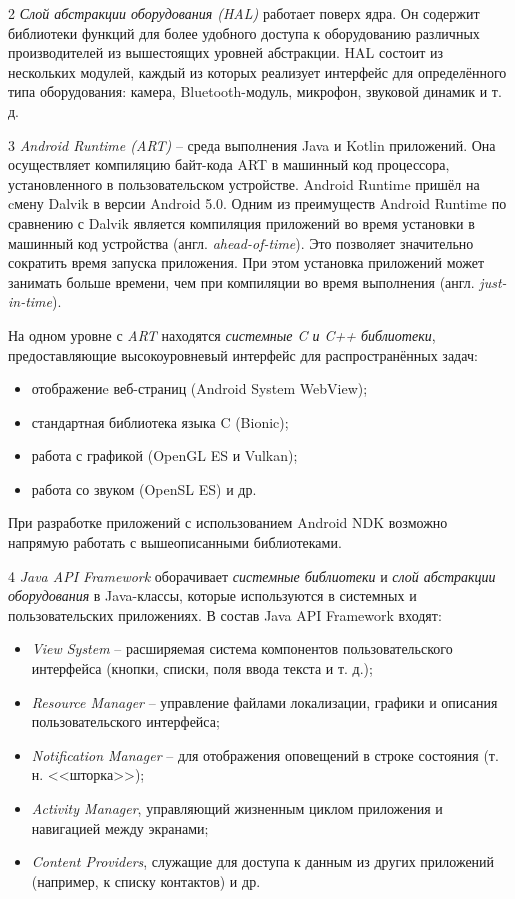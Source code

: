 2 \textit{Слой абстракции оборудования (HAL)} работает поверх ядра.
Он содержит библиотеки функций для более удобного доступа к оборудованию различных производителей из вышестоящих уровней абстракции.
HAL состоит из нескольких модулей, каждый из которых реализует интерфейс для определённого типа оборудования: камера, Bluetooth-модуль, микрофон, звуковой динамик и т. д. 

3 \textit{Android Runtime (ART)} -- среда выполнения Java и Kotlin приложений.
Она осуществляет компиляцию байт-кода ART в машинный код процессора, установленного в пользовательском устройстве.
Android Runtime пришёл на cмену Dalvik в версии Android 5.0.
Одним из преимуществ Android Runtime по сравнению с Dalvik является компиляция приложений во время установки в машинный код устройства (англ. \textit{ahead-of-time}).
Это позволяет значительно сократить время запуска приложения.
При этом установка приложений может занимать больше времени, чем при компиляции во время выполнения (англ. \textit{just-in-time}).

На одном уровне с \textit{ART} находятся \textit{системные C и C++ библиотеки}, предоставляющие высокоуровневый интерфейс для распространённых задач:
\begin{itemize}
	\item отображениe веб-страниц (Android System WebView);
	\item стандартная библиотека языка C (Bionic);
	\item работа с графикой (OpenGL ES и Vulkan);
	\item работа со звуком (OpenSL ES) и др.
\end{itemize}

При разработке приложений с использованием Android NDK возможно напрямую работать с вышеописанными библиотеками.

4 \textit{Java API Framework} оборачивает \textit{системные библиотеки} и \textit{слой абстракции оборудования} в Java-классы, которые используются в системных и пользовательских приложениях. В состав Java API Framework входят:
\begin{itemize}
	\item \textit{View System} -- расширяемая система компонентов пользовательского интерфейса (кнопки, списки, поля ввода текста и т. д.);
	\item \textit{Resource Manager} -- управление файлами локализации, графики и описания пользовательского интерфейса;
	\item \textit{Notification Manager} -- для отображения оповещений в строке состояния (т. н. <<шторка>>);
	\item \textit{Activity Manager}, управляющий жизненным циклом приложения и навигацией между экранами;
	\item \textit{Content Providers}, служащие для доступа к данным из других приложений (например, к списку контактов) и др.
\end{itemize}

